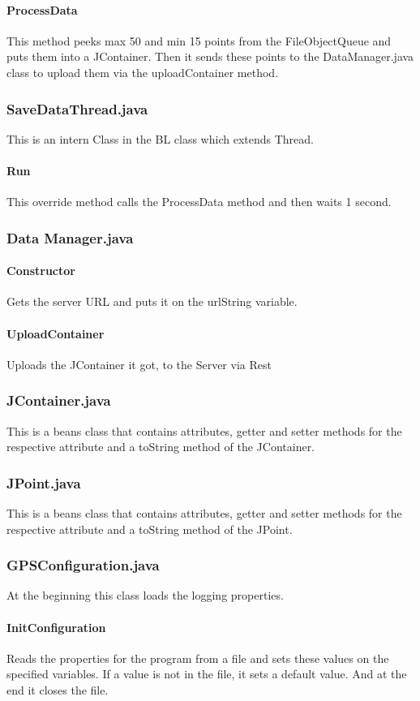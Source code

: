 \paragraph{ProcessData}
This method peeks max 50 and min 15 points from the FileObjectQueue and puts them into a JContainer. Then it sends these points to the DataManager.java class to upload them via the uploadContainer method.
\subsubsection{SaveDataThread.java}
This is an intern Class in the BL class which extends Thread.
\paragraph{Run}
This override method calls the ProcessData method and then waits 1 second.
\subsubsection{Data Manager.java}
\paragraph{Constructor}
Gets the server URL and puts it on the urlString variable.
\paragraph{UploadContainer}
Uploads the JContainer it got, to the Server via Rest 
\subsubsection{JContainer.java}
This is a beans class that contains attributes, getter and setter methods for the respective attribute and a toString method of the JContainer.
\subsubsection{JPoint.java}
This is a beans class that contains attributes, getter and setter methods for the respective attribute and a toString method of the JPoint.
\subsubsection{GPSConfiguration.java}
At the beginning this class loads the logging properties.
\paragraph{InitConfiguration}
Reads the properties for the program from a file and sets these values on the specified variables. If a value is not in the file, it sets a default value. And at the end it closes the file.
